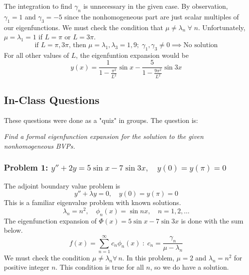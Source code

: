 The integration to find $\gamma_n$ is unnecessary in the given case. By observation, $\gamma_1=1$ and $\gamma_3=-5$ since the nonhomogeneous part are just scalar multiples of our eigenfunctions. We must check the condition that $\mu\neq\lambda_n \;\forall\; n$. Unfortunately, $\mu=\lambda_1=1$ if $L=\pi$ or $L=3\pi$.
\begin{equation*}
   \text{if } L=\pi,3\pi \text{, then } \mu = \lambda_1,\lambda_3 = 1,9;\; \gamma_1,\gamma_3\neq 0 \implies \text{No solution}
\end{equation*}
For all other values of $L$, the eigenfuntion expansion would be
\begin{equation}
    y(x) = \frac{1}{1-\frac{\pi^2}{L^2}}\sin{x} - \frac{5}{1-\frac{9\pi^2}{L^2}}\sin{3x}
\end{equation}

\subsection{In-Class Questions}

These questions were done as a "quiz" in groups. The question is:

\textit{Find a formal eigenfunction expansion for the solution to the given nonhomogeneous BVPs.}

\subsubsection{Problem 1: $y''+2y=5\sin x -7\sin 3x,\quad y(0)=y(\pi)=0$}
The adjoint boundary value problem is
\begin{equation*}
    y''+\lambda y =0, \quad y(0)=y(\pi)=0
\end{equation*}
This is a familiar eigenvalue problem with known solutions.
\begin{equation*}
    \lambda_n=n^2, \quad \phi_n(x) = \sin nx, \quad n=1,2,\dots
\end{equation*}
The eigenfunction expansion of $\Phi(x)=5\sin x -7\sin 3x$ is done with the sum below.
\begin{equation*}
    f(x) = \sum_{n=1}^\infty c_n \phi_n(x) \;:\; c_n=\frac{\gamma_n}{\mu-\lambda_n}
\end{equation*}
We must check the condition $\mu\neq\lambda_n \forall \,n$. In this problem, $\mu=2$ and $\lambda_n=n^2$ for positive integer $n$. This condition is true for all $n$, so we do have a solution.

